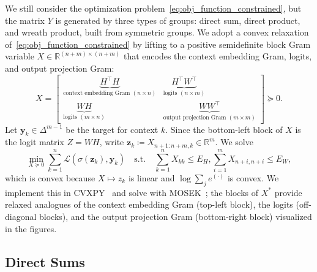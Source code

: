 \documentclass[11pt]{article}
\begin{document}
We still consider the optimization problem~\cref{eq:obj_function_constrained}, but the matrix \(Y\) is generated by three types of groups: direct sum, direct product, and wreath product, built from symmetric groups. We adopt a convex relaxation of~\cref{eq:obj_function_constrained} by lifting to a positive semidefinite block Gram variable \(X\in\mathbb{R}^{(n+m)\times(n+m)}\) that encodes the context embedding Gram, logits, and output projection Gram:
\[
X = 
\begin{bmatrix}
\underbrace{H^{\top}H}_{\text{context embedding Gram }(n\times n)} &
\underbrace{H^{\top}W^{\top}}_{\text{logits }(n\times m)}\\[4pt]
\underbrace{WH}_{\text{logits }(m\times n)} &
\underbrace{WW^{\top}}_{\text{output projection Gram }(m\times m)}
\end{bmatrix}
\succeq 0.
\]
Let \(\boldsymbol{y}_k\in\Delta^{m-1}\) be the target for context \(k\). Since the bottom-left block of \(X\) is the logit matrix \(Z=WH\), write \(\boldsymbol z_k \coloneqq X_{n+1:n+m,k}\in\mathbb{R}^{m}\). We solve
\[
\min_{X\succeq 0} \sum_{k=1}^{n} \mathcal L  \left(\sigma(\boldsymbol z_k),  \boldsymbol{y}_k\right)
\quad\text{s.t.}\quad
\sum_{k=1}^{n}X_{kk}\le E_H,
\sum_{i=1}^{m}X_{n+i,n+i}\le E_W,
\]
which is convex because \(X\mapsto z_k\) is linear and \(\log  \sum_j e^{(\cdot)}\) is convex. We implement this in CVXPY~\citep{diamond2016cvxpy,agrawal2018rewriting} and solve with MOSEK~\citep{mosek}; the blocks of \(X^*\) provide relaxed analogues of the context embedding Gram (top-left block), the logits (off-diagonal blocks), and the output projection Gram (bottom-right block) visualized in the figures.

\subsection{Direct Sums}
\end{document}
